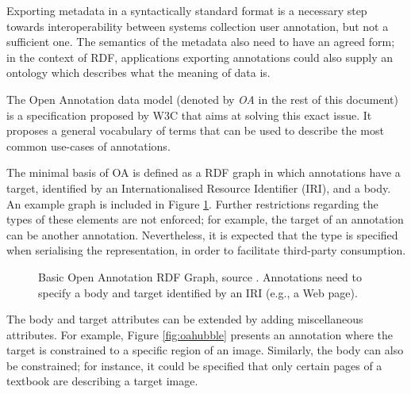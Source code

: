 
Exporting metadata in a syntactically standard format is a necessary step
towards interoperability between systems collection user annotation, but not a
sufficient one. The semantics of the metadata also need to have an agreed form;
in the context of RDF, applications exporting annotations could also supply an
ontology which describes what the meaning of data is.

The Open Annotation \cite{ref:oa} data model (denoted by \textit{OA} in the
rest of this document) is a specification proposed by W3C that aims at solving
this exact issue. It proposes a general vocabulary of terms that can be used to
describe the most common use-cases of annotations.

The minimal basis of OA is defined as a RDF graph in which annotations have a
target, identified by an Internationalised Resource Identifier (IRI), and a
body. An example graph is included in Figure \ref{fig:oa}. Further restrictions
regarding the types of these elements are not enforced; for example, the target
of an annotation can be another annotation. Nevertheless, it is expected that
the type is specified when serialising the representation, in order to
facilitate third-party consumption.

\begin{figure}[!ht]
  \centering
  \caption[Basic Open Annotation RDF Graph]
          {Basic Open Annotation RDF Graph, source \cite{ref:oa}. Annotations
           need to specify a body and target identified by an IRI (e.g., a
           Web page).}
  \label{fig:oa}
\end{figure}

\newpage

The body and target attributes can be extended by adding miscellaneous attributes.
For example, Figure \ref{fig:oahubble} presents an annotation where the target
is constrained to a specific region of an image. Similarly, the body can also
be constrained; for instance, it could be specified that only certain pages of
a textbook are describing a target image.


